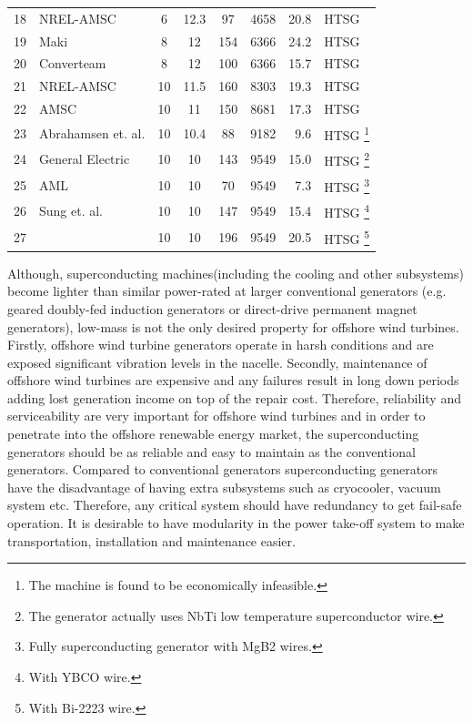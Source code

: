 \documentclass[12pt]{iopart}
\begin{document}
\begin{table}[]
\begin{minipage}{\textwidth}
\begin{tabular}{llcccrrl}
18 & NREL-AMSC \cite{Maples2010}  & 6 & 12.3 & 97 & 4658 & 20.8 & HTSG  \\
19 & Maki \cite{Maki2008}  & 8 & 12 & 154 & 6366 & 24.2 & HTSG  \\
20 & Converteam \cite{Lewis2007} & 8 & 12 & 100 & 6366 & 15.7 & HTSG  \\
21 & NREL-AMSC \cite{Maples2010} & 10 & 11.5 & 160 & 8303 & 19.3 & HTSG  \\
22 & AMSC \cite{Snitchler2010} & 10 & 11 & 150 & 8681 & 17.3 & HTSG  \\
23 & Abrahamsen et. al. \cite{Abrahamsen2010}& 10 & 10.4 & 88 & 9182 & 9.6 & HTSG \footnote{The machine is found to be economically infeasible.} \\
24 & General Electric \cite{Fair2012} & 10 & 10 & 143 & 9549 & 15.0 & HTSG \footnote{The generator actually uses NbTi low temperature superconductor wire.} \\
25 & AML \cite{Masson2011} & 10 & 10 & 70 & 9549 & 7.3 & HTSG \footnote{Fully superconducting generator with MgB2 wires.} \\
26 & Sung et. al. \cite{Sung2013} & 10 & 10 & 147 & 9549 & 15.4 & HTSG \footnote{With YBCO wire.} \\
27 & & 10 & 10 & 196 & 9549 & 20.5 & HTSG \footnote{With Bi-2223 wire.} \\
\hline
\end{tabular}
\end{minipage}
\end{table}

Although, superconducting machines(including the cooling and other subsystems) become lighter than similar power-rated at larger  conventional generators (e.g. geared doubly-fed induction generators or direct-drive permanent magnet generators), low-mass is not the only desired property for offshore wind turbines. Firstly, offshore wind turbine generators operate in harsh conditions and are exposed significant vibration levels in the nacelle. Secondly, maintenance of offshore wind turbines are expensive and any failures result in long down periods adding lost generation income on top of the repair cost. Therefore, reliability and serviceability are very important for offshore wind turbines and in order to penetrate into the offshore renewable energy market, the superconducting generators should be as reliable and easy to maintain as the conventional generators. 
Compared to conventional generators superconducting generators have the disadvantage of having extra subsystems such as cryocooler, vacuum system etc. Therefore, any critical system should have redundancy to get fail-safe operation. It is desirable to have modularity in the power take-off system to make transportation, installation and maintenance easier.
\end{document}
